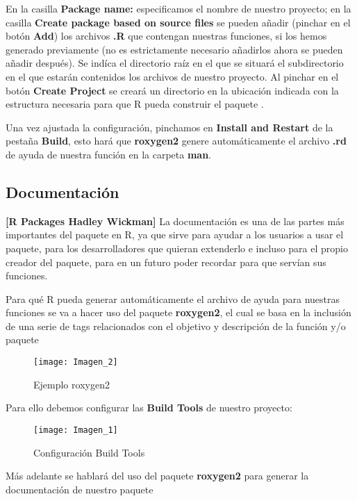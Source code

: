 En la casilla \textbf{Package name:} especificamos el nombre de nuestro proyecto; en la casilla
\textbf{Create package based on source files} se pueden a\~nadir (pinchar en el bot\'on \textbf{Add}) los
archivos \textbf{.R} que contengan nuestras funciones, si los hemos generado previamente (no es
estrictamente necesario a\~nadirlos ahora se pueden a\~nadir despu\'es).
Se ind\'ica el directorio ra\'iz en el que se situar\'a el subdirectorio en el que estar\'an
contenidos los archivos de nuestro proyecto. 
Al pinchar en el bot\'on \textbf{Create Project} se crear\'a un directorio en la ubicaci\'on indicada con la
estructura necesaria para que R pueda construir el paquete \cite{datavu}.

Una vez ajustada la configuraci\'on, pinchamos en \textbf{Install and Restart} de la pesta\~na \textbf{Build}, esto har\'a que \textbf{roxygen2} genere autom\'aticamente el archivo \textbf{.rd} de ayuda de nuestra funci\'on en la carpeta \textbf{man}.

\subsection{Documentaci\'on}
\textbf{[R Packages Hadley Wickman]}
La documentaci\'on es una de las partes m\'as importantes del paquete en R, ya que sirve para
ayudar a los usuarios a usar el paquete, para los desarrolladores que quieran extenderlo e
incluso para el propio creador del paquete, para en un futuro poder recordar para que serv\'ian
sus funciones.

Para qu\'e R pueda generar autom\'aticamente el archivo de ayuda para nuestras funciones
se va a hacer uso del paquete \textbf{roxygen2}, el cual se basa en la inclusi\'on de una serie de tags relacionados con el objetivo y descripci\'on de la funci\'on y/o paquete 


\begin{figure}[H]
    \centering
    \texttt{[image: Imagen\_2]}
    \caption{Ejemplo roxygen2   }
    \label{fig:roxygen}
\end{figure} 

Para ello debemos configurar las \textbf{Build Tools} de nuestro proyecto:

\begin{figure}[H]
    \centering
    \texttt{[image: Imagen\_1]}
    \caption{Configuraci\'on Build Tools }
    \label{fig:build_tools}
\end{figure} 

M\'as adelante se hablar\'a del uso del paquete \textbf{roxygen2} para generar la documentaci\'on de nuestro paquete

